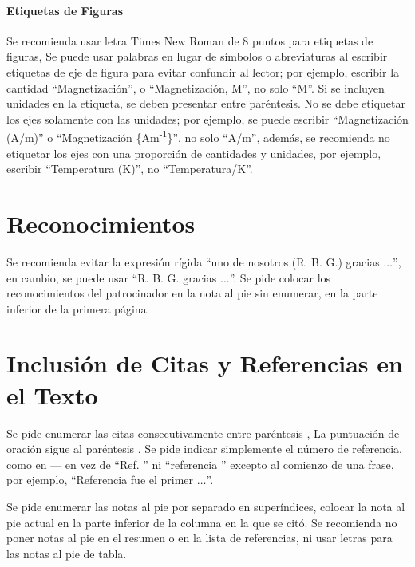 \documentclass[letterpaper, 10pt, conference]{IEEEtran} %
\begin{document}
	\paragraph{Etiquetas de Figuras} Se recomienda usar letra Times New Roman de 8 puntos para etiquetas de figuras, Se puede usar palabras en lugar de símbolos o abreviaturas al escribir etiquetas de eje de figura para evitar confundir al lector; por ejemplo, escribir la cantidad ``Magnetización'', o ``Magnetización, M'', no solo ``M''. Si se incluyen unidades en la etiqueta, se deben presentar entre paréntesis. No se debe etiquetar los ejes solamente con las unidades; por ejemplo, se puede escribir ``Magnetización (A/m)'' o ``Magnetización \{Am\textsuperscript{-1}\}'', no solo ``A/m'', además, se recomienda no etiquetar los ejes con una proporción de cantidades y unidades, por ejemplo, escribir ``Temperatura (K)'', no ``Temperatura/K''.
	
	\section*{Reconocimientos} \label{seccionReconocimientos}
	Se recomienda evitar la expresión rígida ``uno de nosotros (R. B. G.) gracias $\ldots$'', en cambio, se puede usar ``R. B. G. gracias $\ldots$''. Se pide colocar los reconocimientos del patrocinador en la nota al pie sin enumerar, en la parte inferior de la primera página.
	
	\section*{Inclusión de Citas y Referencias en el Texto} \label{seccionInclusionDeCitasYReferenciasEnElTexto}
	Se pide enumerar las citas consecutivamente entre paréntesis \cite{referenciaBibliografica4}, La puntuación de oración sigue al paréntesis \cite{referenciaBibliografica5}. Se pide indicar simplemente el número de referencia, como en \cite{referenciaBibliografica6}--- en vez de ``Ref. \cite{referenciaBibliografica6}'' ni ``referencia \cite{referenciaBibliografica6}'' excepto al comienzo de una frase, por ejemplo, ``Referencia \cite{referenciaBibliografica6} fue el primer $\ldots$''.
	
	Se pide enumerar las notas al pie por separado en superíndices, colocar la nota al pie actual en la parte inferior de la columna en la que se citó. Se recomienda no poner notas al pie en el resumen o en la lista de referencias, ni usar letras para las notas al pie de tabla.
	
\end{document}
